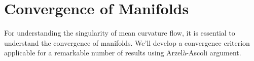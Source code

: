 \chapter{Convergence of Manifolds}


For understanding the singularity of mean curvature flow, it is essential to understand the convergence of manifolds. We'll develop a convergence criterion applicable for a remarkable number of results using Arzel\`a-Ascoli argument. 